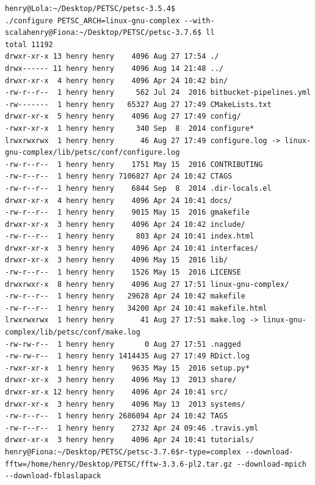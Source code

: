 \documentclass{article}
\begin{document}
\begin{enumerate}
\tiny
\begin{verbatim}
henry@Lola:~/Desktop/PETSC/petsc-3.5.4$ 
./configure PETSC_ARCH=linux-gnu-complex --with-scalahenry@Fiona:~/Desktop/PETSC/petsc-3.7.6$ ll
total 11192
drwxr-xr-x 13 henry henry    4096 Aug 27 17:54 ./
drwx------ 11 henry henry    4096 Aug 14 21:48 ../
drwxr-xr-x  4 henry henry    4096 Apr 24 10:42 bin/
-rw-r--r--  1 henry henry     562 Jul 24  2016 bitbucket-pipelines.yml
-rw-------  1 henry henry   65327 Aug 27 17:49 CMakeLists.txt
drwxr-xr-x  5 henry henry    4096 Aug 27 17:49 config/
-rwxr-xr-x  1 henry henry     340 Sep  8  2014 configure*
lrwxrwxrwx  1 henry henry      46 Aug 27 17:49 configure.log -> linux-gnu-complex/lib/petsc/conf/configure.log
-rw-r--r--  1 henry henry    1751 May 15  2016 CONTRIBUTING
-rw-r--r--  1 henry henry 7106827 Apr 24 10:42 CTAGS
-rw-r--r--  1 henry henry    6844 Sep  8  2014 .dir-locals.el
drwxr-xr-x  4 henry henry    4096 Apr 24 10:41 docs/
-rw-r--r--  1 henry henry    9015 May 15  2016 gmakefile
drwxr-xr-x  3 henry henry    4096 Apr 24 10:42 include/
-rw-r--r--  1 henry henry     803 Apr 24 10:41 index.html
drwxr-xr-x  3 henry henry    4096 Apr 24 10:41 interfaces/
drwxr-xr-x  3 henry henry    4096 May 15  2016 lib/
-rw-r--r--  1 henry henry    1526 May 15  2016 LICENSE
drwxrwxr-x  8 henry henry    4096 Aug 27 17:51 linux-gnu-complex/
-rw-r--r--  1 henry henry   29628 Apr 24 10:42 makefile
-rw-r--r--  1 henry henry   34200 Apr 24 10:41 makefile.html
lrwxrwxrwx  1 henry henry      41 Aug 27 17:51 make.log -> linux-gnu-complex/lib/petsc/conf/make.log
-rw-rw-r--  1 henry henry       0 Aug 27 17:51 .nagged
-rw-rw-r--  1 henry henry 1414435 Aug 27 17:49 RDict.log
-rwxr-xr-x  1 henry henry    9635 May 15  2016 setup.py*
drwxr-xr-x  3 henry henry    4096 May 13  2013 share/
drwxr-xr-x 12 henry henry    4096 Apr 24 10:41 src/
drwxr-xr-x  3 henry henry    4096 May 13  2013 systems/
-rw-r--r--  1 henry henry 2686094 Apr 24 10:42 TAGS
-rw-r--r--  1 henry henry    2732 Apr 24 09:46 .travis.yml
drwxr-xr-x  3 henry henry    4096 Apr 24 10:41 tutorials/
henry@Fiona:~/Desktop/PETSC/petsc-3.7.6$r-type=complex --download-fftw=/home/henry/Desktop/PETSC/fftw-3.3.6-pl2.tar.gz --download-mpich --download-fblaslapack


\end{verbatim}
\end{enumerate}
\end{document}
